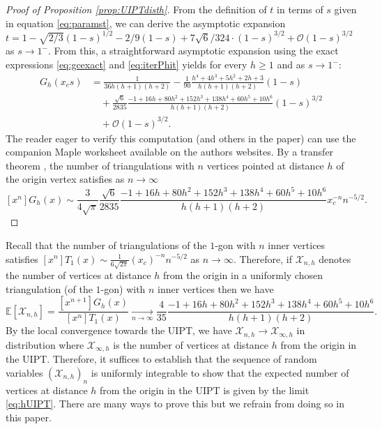 \documentclass[10pt]{amsart}
\theoremstyle{definition}\newtheorem{defi}[theo]{Definition}\newtheorem{rema}[theo]{Remark}\newtheorem{exam}[theo]{Example}\newtheorem{exem}[theo]{Example}\newtheorem{nota}[theo]{Notation}
\begin{document}
\begin{proof}[Proof of Proposition \ref{prop:UIPTdisth}]
{From the definition of $t$ in terms of $s$ given in equation \eqref{eq:paramst}, we can derive the asymptotic expansion $t = 1 - \sqrt{2/3} (1-s)^{1/2}  - 2/9 (1-s) +7\sqrt{6}/324 \cdot (1-s)^{3/2} + \mathcal O (1-s)^{3/2}$ as $s \to 1^-$. From this, a straightforward asymptotic expansion} using the exact expressions \eqref{eq:gcexact} and \eqref{eq:iterPhit} yields for every $h \geq 1$ and as $s\to1^-$:
\begin{align*}
G_h(x_c s) &=
\frac{1}{36 h (h+1) (h+2)}
- \frac{1}{90} \frac{h^4+4h^3+5h^2+2h+3}{h(h+1)(h+2)} \left(1-s\right)\\
& \quad + \frac{\sqrt{6}}{2835} \frac{-1+16h+80h^2+152h^3+138h^4+60h^5+10h^6}{h(h+1)(h+2)} \left( 1-s \right)^{3/2}\\
& \quad + \mathcal{O} \left( 1-s \right)^{3/2}.
\end{align*}
The reader eager to verify this computation (and others in the paper) can use the companion Maple worksheet available on the authors websites.
By a transfer theorem \cite[Theorem VI.4 p. 393]{FS}, the number of triangulations with $n$ vertices pointed at distance $h$ of the origin vertex satisfies as $n \to \infty $
\[
\left[ x^{n} \right] G_h(x) \sim \frac{3}{4 \sqrt \pi} \frac{\sqrt{6}}{2835} \frac{-1+16h+80h^2+152h^3+138h^4+60h^5+10h^6}{h(h+1)(h+2)}
x_c^{-n} n^{-5/2}.
\]
\end{proof}

\begin{remark}
Recall that the number of triangulations of the $1$-gon with $n$ inner vertices satisfies $[ x^{n} ] T_1(x) \sim \frac{1}{6 \sqrt{2 \pi}} (x_c)^{-n} n^{-5/2}$ as $n \to \infty$. Therefore, if $ \mathcal{X}_{n,h}$ denotes the number of vertices at distance $h$ from the origin in a uniformly chosen triangulation (of the $1$-gon) with $n$ inner vertices then we have
\begin{equation}
\label{eq:hUIPT}
\mathbb{E}[ \mathcal{X}_{n,h}] = \frac{\left[ x^{n+1} \right] G_h(x)}{\left[ x^{n} \right] T_1(x)} \xrightarrow[n\to\infty]{} \frac{4}{35} \frac{-1+16h+80h^2+152h^3+138h^4+60h^5+10h^6}{h(h+1)(h+2)}.
\end{equation}
By the local convergence towards the UIPT, we have $ \mathcal{X}_{n,h} \to \mathcal{X}_{\infty,h}$ in distribution where $\mathcal{X}_{\infty,h}$ is the number of vertices at distance $h$ from the origin in the UIPT. Therefore, it suffices to establish that the sequence of random variables $(\mathcal{X}_{n,h})_n$ is uniformly integrable to show that the expected number of vertices at distance $h$ from the origin in the UIPT is given by the limit \eqref{eq:hUIPT}. There are many ways to prove this but we refrain from doing so in this paper.
\end{remark}
\end{document}
